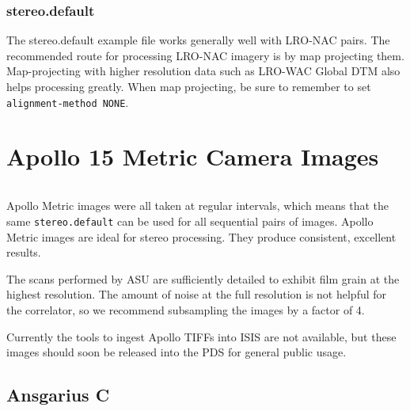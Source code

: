 \subsubsection*{stereo.default}

The stereo.default example file works generally well with LRO-NAC
pairs. The recommended route for processing LRO-NAC imagery is by map
projecting them. Map-projecting with higher resolution data such as
LRO-WAC Global DTM also helps processing greatly. When map projecting,
be sure to remember to set \texttt{alignment-method NONE}.

\section{Apollo 15 Metric Camera Images}

\begin{tabular}{ r c r c}

\end{tabular}

Apollo Metric images were all taken at regular intervals, which means
that the same \texttt{stereo.default} can be used for all sequential
pairs of images. Apollo Metric images are ideal for stereo processing.
They produce consistent, excellent results.

The scans performed by ASU are sufficiently detailed to exhibit film
grain at the highest resolution.  The amount of noise at the full
resolution is not helpful for the correlator, so we recommend
subsampling the images by a factor of 4.

Currently the tools to ingest Apollo TIFFs into ISIS are not
available, but these images should soon be released into the PDS for
general public usage.

\subsection{Ansgarius C}


